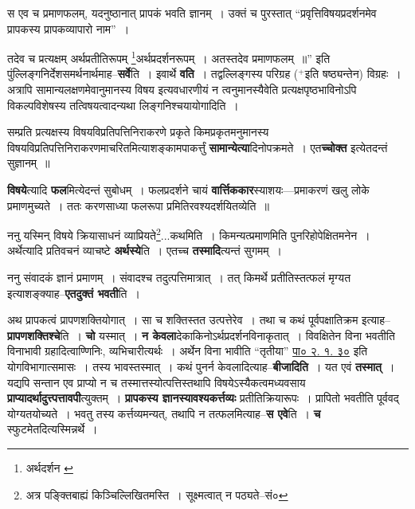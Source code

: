 \documentclass[article,12pt,a4paper]{memoir}
\newcommand{\add}[1]{($^{+}$#1)}
\begin{document}
	स एव च प्रमाणफलम्, यदनुष्ठानात् प्रापकं भवति ज्ञानम् । उक्तं च पुरस्तात् “प्रवृत्तिविषयप्रदर्शनमेव प्रापकस्य प्रापकव्यापारो नाम” । 
	  
	तदेव च प्रत्यक्षम् अर्थप्रतीतिरूपम् \footnote{अर्थदर्शन \cite{dp-msA} \cite{dp-edP} \cite{dp-edH} \cite{dp-edE} \cite{dp-edN}}\-अर्थप्रदर्शनरूपम् । अतस्तदेव प्रमाणफलम् ॥” इति पुंल्लिङ्गनिर्देशसमर्थनार्थमाह--\textbf{सर्वे}ति । इवार्थे \textbf{वति} । तद्वल्लिङ्गस्य परिग्रह \add{इति षष्ठ्यन्तेन} विग्रहः । अत्रापि सामान्यलक्षणमेवानुमानस्य विषय इत्यवधारणीयं न त्वनुमानस्यैवेति प्रत्यक्षपृष्ठभाविनोऽपि विकल्पविशेषस्य तत्विषयत्वादन्यथा लिङ्गनिश्चयायोगादिति ।
	\pend
      

	  \pstart सम्प्रति प्रत्यक्षस्य विषयविप्रतिपत्तिनिराकरणे प्रकृते किमप्रकृतमनुमानस्य विषयविप्रतिपत्तिनिराकरणमाचरितमित्याशङ्कामपाकर्त्तुं \textbf{सामान्येत्या}दिनोपक्रमते । एत\textbf{च्चोक्त} इत्येतदन्तं सुज्ञानम् ॥
	\pend
      

	  \pstart \textbf{विषये}त्यादि \textbf{फल}मित्येदन्तं सुबोधम् । फलप्रदर्शने चायं \textbf{वार्त्तिककार}स्याशयः—प्रमाकरणं खलु लोके प्रमाणमुच्यते । ततः करणसाध्या फलरूपा प्रमितिरवश्यदर्शयितव्येति ॥
	\pend
      

	  \pstart ननु यस्मिन् विषये क्रियासाधनं व्याप्रियते\footnote{अत्र पङ्क्तिबाह्यं किञ्चिल्लिखितमस्ति । सूक्ष्मत्वात् न पठ्यते--सं०}\-...कथमिति । किमन्यत्प्रमाणमिति पुनरिहोपेक्षितमनेन । अर्थेत्यादि प्रतिवचनं व्याचष्टे \textbf{अर्थस्ये}ति । एतच्च \textbf{तस्मादि}त्यन्तं सुगमम् ।
	\pend
      

	  \pstart ननु संवादकं ज्ञानं प्रमाणम् । संवादश्च तदुत्पत्तिमात्रात् । तत् किमर्थे प्रतीतिस्तत्फलं मृग्यत इत्याशङ्क्याह--\textbf{एतदुक्तं भवती}ति ।
	\pend

	  \pstart अथ प्रापकत्वं प्रापणशक्तियोगात् । सा च शक्तिस्तत उत्पत्तेरेव । तथा च कथं पूर्वपक्षातिक्रम इत्याह--\textbf{प्रापणशक्तिश्चे}ति । \textbf{चो} यस्मात् । \textbf{न केवला}देकाकिनोऽर्थप्रदर्शनविनाकृतात् । विवक्षितेन विना भवतीति विनाभावी ग्रहादित्वाण्णिनिः, व्यभिचारीत्यर्थः । अर्थेन विना भावीति “तृतीया” \href{http://http://sarit.indology.info/?cref=Pā.2.1.30}{पा० २. १. ३०} इति योगविभागात्समासः । तस्य भावस्तस्मात् । कथं पुनर्न केवलादित्याह--\textbf{बीजादिति} । यत एवं \textbf{तस्मात्} । यद्यपि सन्तान एव प्राप्यो न च तस्मात्तस्योत्पत्तिस्तथापि विषयेऽस्यैकत्वमध्यवसाय \textbf{प्राप्यादर्थादुत्त्पत्तावपी}त्युक्तम् । \textbf{प्रापकस्य ज्ञानस्यावश्यकर्त्तव्यः} प्रतीतिक्रियारूपः । प्रापितो भवतीति पूर्ववद् योग्यत\leavevmode{}योच्यते । भवतु तस्य कर्त्तव्यमन्यत्, तथापि न तत्फलमित्याह--\textbf{स एवे}ति । \textbf{च} स्फुटमेतदित्यस्मिन्नर्थे ।
	\pend
      
\end{document}
